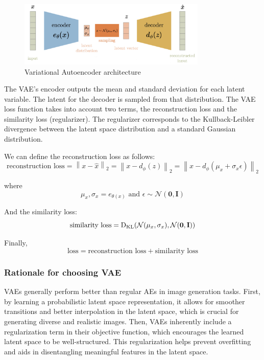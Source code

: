 \documentclass{article}
\begin{document}
\begin{figure}[H]
    \centering
    \includegraphics[width=0.8\textwidth]{images/vae.png}
    \caption{Variational Autoencoder architecture}
\end{figure}

The VAE's encoder outputs the mean and standard deviation for each latent variable. The latent for the decoder is sampled from that distribution.
The VAE loss function takes into account two terms, the reconstruction loss and the similarity loss (regularizer). 
The regularizer corresponds to the Kullback-Leibler divergence between the latent space distribution and a standard Gaussian distribution.
  
We can define the reconstruction loss as follows:
$$\text{reconstruction loss} = \left\| x -\hat{x}\right\|_{2}=\left\| x-d_{\phi}(z) \right\|_{2}=\left\| x-d_{\phi}(\mu_{x}+\sigma_{x}\epsilon) \right\|_{2}$$

where
$$\mu_{x},\sigma_{x}=e_{\theta(x)} \text{ and } \epsilon\sim\mathcal{N}(\textbf{0},\textbf{I})$$


And the similarity loss:
$$\text{similarity loss}=\mathrm{D}_{\mathrm{KL}}(\mathcal{N}(\mu_{x},\sigma_{x}), \mathcal{N}(\textbf{0},\textbf{I})) \\$$

Finally,
$$\text{loss}=\text{reconstruction loss}+\text{similarity loss}$$

\subsubsection*{Rationale for choosing VAE}
VAEs generally perform better than regular AEs in image generation tasks. 
First, by learning a probabilistic latent space representation, it allows for smoother transitions and better interpolation in the latent space, which is crucial for generating diverse and realistic images. 
Then, VAEs inherently include a regularization term in their objective function, which encourages the learned latent space to be well-structured. 
This regularization helps prevent overfitting and aids in disentangling meaningful features in the latent space.
  
\end{document}
